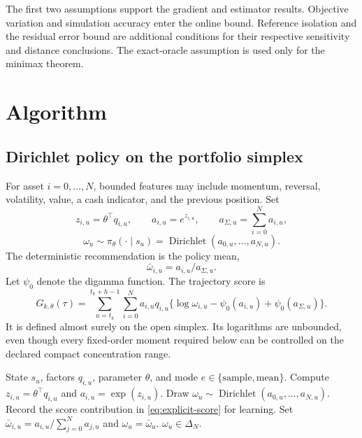 \documentclass[11pt]{article}
\newcommand{\1}{\mathbf 1}
\newcommand{\Dir}{\operatorname{Dirichlet}}
\begin{document}
The first two assumptions support the gradient and estimator results. Objective variation and simulation accuracy enter the online bound. Reference isolation and the residual error bound are additional conditions for their respective sensitivity and distance conclusions. The exact-oracle assumption is used only for the minimax theorem.

\section{Algorithm}\label{sec:algorithm}
\subsection{Dirichlet policy on the portfolio simplex}
For asset $i=0,\ldots,N$, bounded features may include momentum, reversal, volatility, value, a cash indicator, and the previous position. Set
\begin{equation}\label{eq:dir-score}
 z_{i,u}=\theta^\top q_{i,u},\qquad a_{i,u}=e^{z_{i,u}},\qquad a_{\Sigma,u}=\sum_{i=0}^Na_{i,u},
\end{equation}
\begin{equation}\label{eq:dirichlet-policy}
 \omega_u\sim\pi_\theta(\cdot\mid s_u)=\Dir(a_{0,u},\ldots,a_{N,u}).
\end{equation}
The deterministic recommendation is the policy mean,
\begin{equation}\label{eq:dirichlet-mean}
 \bar\omega_{i,u}=a_{i,u}/a_{\Sigma,u}.
\end{equation}
Let $\psi_0$ denote the digamma function. The trajectory score is
\begin{equation}\label{eq:explicit-score}
 G_{k,\theta}(\tau)=\sum_{u=t_k}^{t_k+h-1}\sum_{i=0}^N
 a_{i,u}q_{i,u}
 \{\log\omega_{i,u}-\psi_0(a_{i,u})+\psi_0(a_{\Sigma,u})\}.
\end{equation}
It is defined almost surely on the open simplex. Its logarithms are unbounded, even though every fixed-order moment required below can be controlled on the declared compact concentration range.


\begin{algorithm}[t]
\caption{Dirichlet factor policy for portfolio generation}\label{alg:dirichlet}
\begin{algorithmic}[1]
\Require State $s_u$, factors $q_{i,u}$, parameter $\theta$, and mode $e\in\{\mathrm{sample},\mathrm{mean}\}$.
    \State Compute $z_{i,u}=\theta^\top q_{i,u}$ and $a_{i,u}=\exp(z_{i,u})$.
\EndFor
{}
    \State Draw $\omega_u\sim\Dir(a_{0,u},\ldots,a_{N,u})$.
    \State Record the score contribution in \eqref{eq:explicit-score} for learning.
\Else
    \State Set $\bar\omega_{i,u}=a_{i,u}/\sum_{j=0}^{N}a_{j,u}$ and $\omega_u=\bar\omega_u$.
\EndIf
\State \Return $\omega_u\in\Delta_N$.
\end{algorithmic}
\end{algorithm}
\end{document}
